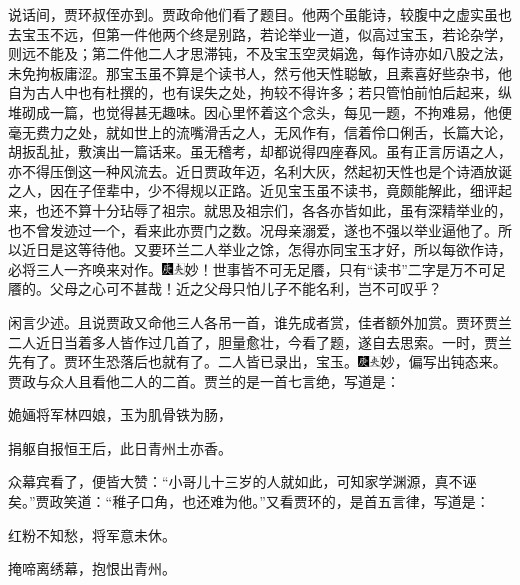 说话间，贾环叔侄亦到。贾政命他们看了题目。他两个虽能诗，较腹中之虚实虽也去宝玉不远，但第一件他两个终是别路，若论举业一道，似高过宝玉，若论杂学，则远不能及；第二件他二人才思滞钝，不及宝玉空灵娟逸，每作诗亦如八股之法，未免拘板庸涩。那宝玉虽不算是个读书人，然亏他天性聪敏，且素喜好些杂书，他自为古人中也有杜撰的，也有误失之处，拘较不得许多；若只管怕前怕后起来，纵堆砌成一篇，也觉得甚无趣味。因心里怀着这个念头，每见一题，不拘难易，他便毫无费力之处，就如世上的流嘴滑舌之人，无风作有，信着伶口俐舌，长篇大论，胡扳乱扯，敷演出一篇话来。虽无稽考，却都说得四座春风。虽有正言厉语之人，亦不得压倒这一种风流去。近日贾政年迈，名利大灰，然起初天性也是个诗酒放诞之人，因在子侄辈中，少不得规以正路。近见宝玉虽不读书，竟颇能解此，细评起来，也还不算十分玷辱了祖宗。就思及祖宗们，各各亦皆如此，虽有深精举业的，也不曾发迹过一个，看来此亦贾门之数。况母亲溺爱，遂也不强以举业逼他了。所以近日是这等待他。又要环兰二人举业之馀，怎得亦同宝玉才好，所以每欲作诗，必将三人一齐唤来对作。{\includegraphics[width=3mm]{../Images/00004}\includegraphics[width=3mm]{../Images/00012}\footnotesize \kaishu 妙！世事皆不可无足餍，只有``读书''二字是万不可足餍的。父母之心可不甚哉！近之父母只怕儿子不能名利，岂不可叹乎？}

闲言少述。且说贾政又命他三人各吊一首，谁先成者赏，佳者额外加赏。贾环贾兰二人近日当着多人皆作过几首了，胆量愈壮，今看了题，遂自去思索。一时，贾兰先有了。贾环生恐落后也就有了。二人皆已录出，宝玉。{\includegraphics[width=3mm]{../Images/00004}\includegraphics[width=3mm]{../Images/00012}\footnotesize \kaishu 妙，偏写出钝态来。}贾政与众人且看他二人的二首。贾兰的是一首七言绝，写道是：

姽婳将军林四娘，玉为肌骨铁为肠，

捐躯自报恒王后，此日青州土亦香。

众幕宾看了，便皆大赞：``小哥儿十三岁的人就如此，可知家学渊源，真不诬矣。''贾政笑道：``稚子口角，也还难为他。''又看贾环的，是首五言律，写道是：

红粉不知愁，将军意未休。

掩啼离绣幕，抱恨出青州。

